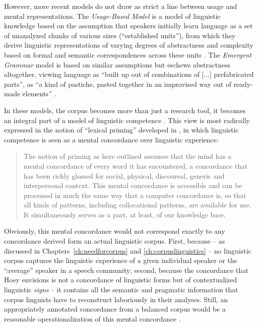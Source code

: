 However, more recent models do not draw as strict a line between usage and mental representations. The \textit{Usage\hyp{}Based Model} \citep{langacker_concept_1991} is a model of linguistic knowledge based on the assumption that speakers initially learn language as a set of unanalyzed chunks of various sizes (``established units''), from which they derive linguistic representations of varying degrees of abstractness and complexity  based on formal and semantic  correspondences across these units \citep[cf.][266f]{langacker_concept_1991}. The \textit{Emergent Grammar}  model is based on similar assumptions but eschews abstractness altogether, viewing language as ``built up out of combinations of [...] prefabricated parts'', as ``a kind of pastiche, pasted together in an improvised way out of ready\hyp{}made elements'' \citep[144]{hopper_emergent_1987}.

In these models, the corpus becomes more than just a research tool, it becomes an integral part of a model of linguistic competence  \citep[cf.][]{brdar_cognitive_2011}. This view is most radically expressed in the notion of ``lexical priming''  developed in \citet{hoey_lexical_2005}, in which linguistic competence is seen as a mental concordance  over linguistic experience:

\begin{quotation}
The notion of priming as here outlined assumes that the mind has a mental concordance  of every word it has encountered, a concordance that has been richly glossed for social, physical, discoursal, generic and interpersonal context. This mental concordance is accessible and can be processed in much the same way that a computer concordance is, so that all kinds of patterns, including collocational  patterns, are available for use. It simultaneously serves as a part, at least, of our knowledge base. \citep[11]{hoey_lexical_2005}
\end{quotation}

Obviously, this mental concordance  would not correspond exactly to any concordance derived form an actual linguistic corpus. First, because -- as discussed in Chapters~\ref{ch:needforcorpus} and \ref{ch:corpuslinguistics} -- no linguistic corpus captures the linguistic experience of a given individual speaker or the ``average'' speaker in a speech community; second, because the concordance  that Hoey envisions is not a concordance of linguistic forms but of contextualized linguistic \textit{signs} -- it contains all the semantic  and pragmatic  information that corpus linguists have to reconstruct laboriously in their analyses. Still, an appropriately annotated  concordance  from a balanced corpus would be a reasonable operationalization  of this mental concordance \citep[cf. also][]{taylor_mental_2012}.

